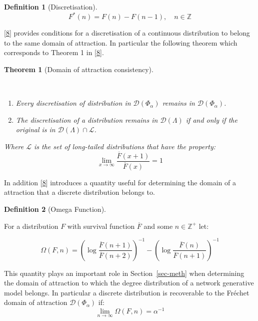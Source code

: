\documentclass[
  10pt,
  a4paper,
]{scrreprt}
\providecommand{\tightlist}{%
  \setlength{\itemsep}{0pt}\setlength{\parskip}{0pt}}\usepackage{longtable,booktabs,array}
\theoremstyle{definition}
\newtheorem{definition}{Definition}[section]
\theoremstyle{plain}
\newtheorem{theorem}{Theorem}[section]
\theoremstyle{plain}
\theoremstyle{remark}
\begin{document}
{\begin{definition}[Discretisation]
\[F^*(n) = F(n) - F(n-1), \quad n   \in \mathbb Z\]

\end{definition}

{[}\protect\hyperlink{ref-shimura12}{8}{]} provides conditions for a
discretisation of a continuous distribution to belong to the same domain
of attraction. In particular the following theorem which corresponds to
Theorem 1 in {[}\protect\hyperlink{ref-shimura12}{8}{]}.

\begin{theorem}[Domain of attraction
consistency]\protect\hypertarget{thm-shimura1}{}\label{thm-shimura1}

~

\begin{enumerate}
\def\labelenumi{(\alph{enumi})}
\tightlist
\item
  Every discretisation of distribution in \(\mathcal D(\Phi_\alpha)\)
  remains in \(\mathcal D(\Phi_\alpha)\).
\item
  The discretisation of a distribution remains in
  \(\mathcal D(\Lambda)\) if and only if the original is in
  \(\mathcal D(\Lambda)\cap \mathcal L\).
\end{enumerate}

Where \(\mathcal L\) is the set of long-tailed distributions that have
the property: \[
\lim_{x\rightarrow \infty}\displaystyle\frac{\overline F(x+1)}{\overline F(x)} = 1   
\]

\end{theorem}

In addition {[}\protect\hyperlink{ref-shimura12}{8}{]} introduces a
quantity useful for determining the domain of a attraction that a
discrete distribution belongs to.

\begin{definition}[Omega
Function]\protect\hypertarget{def-omega}{}\label{def-omega}

For a distribution \(F\) with survival function \(\overline F\) and some
\(n\in\mathbb Z^+\) let:

\[
\Omega(F,n) = \left(\log\displaystyle\frac{\overline F (n+1)}{\overline F (n+2)}\right)^{-1} - \left(\log\displaystyle\frac{\overline F (n)}{\overline F (n+1)}\right)^{-1}
\]

\end{definition}

This quantity plays an important role in Section~\ref{sec-meth} when
determining the domain of attraction to which the degree distribution of
a network generative model belongs. In particular a discrete
distribution is recoverable to the Fréchet domain of attraction
\(\mathcal D(\Phi_\alpha)\) if: \[
\lim_{n\rightarrow\infty}\Omega(F,n) = \alpha^{-1}
\]

}
\end{document}
